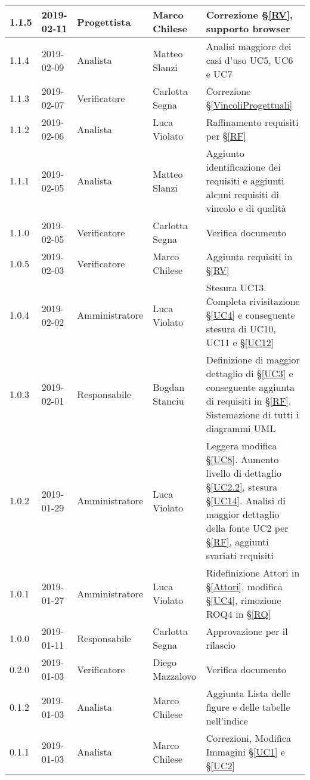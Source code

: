 \begin{center}
\begin{longtable}[C]{|m{}|m{}|m{}|m{}|p{}|}
\hline
\rowcolor{grigio}1.1.5 & 2019-02-11 & Progettista & Marco Chilese & Correzione §\ref{RV}, supporto browser\\
\hline
1.1.4 & 2019-02-09 & Analista & Matteo Slanzi & Analisi maggiore dei casi d'uso UC5, UC6 e UC7\\
\hline
\rowcolor{grigio} 1.1.3 & 2019-02-07 & Verificatore & Carlotta Segna & Correzione §\ref{VincoliProgettuali}\\
\hline
1.1.2 & 2019-02-06 & Analista & Luca Violato & Raffinamento requisiti per §\ref{RF}\\
\hline
\rowcolor{grigio}1.1.1 & 2019-02-05 & Analista & Matteo Slanzi & Aggiunto identificazione dei requisiti e  aggiunti alcuni requisiti di vincolo e di qualità \\
\hline
1.1.0 & 2019-02-05 & Verificatore & Carlotta Segna & Verifica documento \\
\hline
\rowcolor{grigio}1.0.5 & 2019-02-03 & Verificatore & Marco Chilese & Aggiunta requisiti in §\ref{RV}\\
\hline
1.0.4 & 2019-02-02 & Amministratore & Luca Violato & Stesura UC13. Completa rivisitazione §\ref{UC4} e conseguente stesura di UC10, UC11 e §\ref{UC12}\\
\hline
\rowcolor{grigio}1.0.3 & 2019-02-01 & Responsabile & Bogdan Stanciu &  Definizione di maggior dettaglio di §\ref{UC3} e conseguente aggiunta di requisiti in §\ref{RF}. Sistemazione di tutti i diagrammi UML \\
\hline
1.0.2 & 2019-01-29 & Amministratore & Luca Violato & Leggera modifica §\ref{UC8}. Aumento livello di dettaglio §\ref{UC2.2}, stesura §\ref{UC14}. Analisi di maggior dettaglio della fonte UC2 per §\ref{RF}, aggiunti svariati requisiti\\
\hline
\rowcolor{grigio}1.0.1 & 2019-01-27 & Amministratore & Luca Violato & Ridefinizione Attori in §\ref{Attori}, modifica §\ref{UC4}, rimozione ROQ4 in §\ref{RQ}\\
\hline
1.0.0 & 2019-01-11 & Responsabile & Carlotta Segna & Approvazione per il rilascio \\
\hline
\rowcolor{grigio}0.2.0 & 2019-01-03 & Verificatore & Diego Mazzalovo & Verifica documento\\
\hline
0.1.2 & 2019-01-03 & Analista & Marco Chilese & Aggiunta Lista delle figure e delle tabelle nell'indice\\
\hline
\rowcolor{grigio}0.1.1 & 2019-01-03 & Analista & Marco Chilese & Correzioni, Modifica Immagini §\ref{UC1} e §\ref{UC2}\\

\end{longtable}
\end{center}
